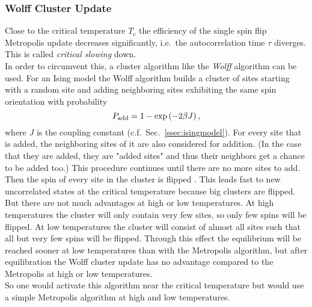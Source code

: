     \subsubsection{Wolff Cluster Update}
    \label{sssec:wolff}
        Close to the critical temperature \(T_c\) the efficiency of the
        single spin flip Metropolis update decreases significantly, i.e.\ the
        autocorrelation time \(\tau\) diverges.
        This is called \emph{critical slowing} down.\\
        In order to circumvent this, a cluster algorithm like the \emph{Wolff}
        algorithm \cite{Wolff1989} can be used.
        For an Ising model the Wolff algorithm builds a cluster of sites
        starting with a random site and adding neighboring sites exhibiting the
        same spin orientation with probability
        \begin{equation}
            P_{\mathrm{add}} = 1-\exp\left(-2\beta J\right),
            \label{eq:wolffAdd}
        \end{equation}
        where \(J\) is the coupling constant (c.f.\ Sec.\ \ref{ssec:isingmodel}).
        For every site that is added, the neighboring sites of it are
        also considered for addition. (In the case that they are added,
        they are "added sites" and thus their neighbors get a chance to be
        added too.)
        This procedure continues until there are no more sites to add.
        Then the spin of every site in the cluster is flipped
        \cite[p. 91ff]{NewmanBarkema1999} \cite[p. 151f]{Katzgraber2011}.
        This leads fast to new uncorrelated states at the critical
        temperature because big clusters are flipped. But there are not
        much advantages at high or low temperatures. At high temperatures the cluster
        will only contain very few sites, so only few spins will be flipped.
        At low temperatures the cluster will consist of almost all sites
        such that all but very few spins will be flipped. Through this effect the equilibrium
        will be reached sooner at low temperatures than with the Metropolis
        algorithm, but after equilibration the Wolff cluster update has no
        advantage compared to the Metropolis at high or low temperatures.\\
        So one would activate this algorithm near the critical temperature
        but would use a simple Metropolis algorithm at high and low temperatures.

